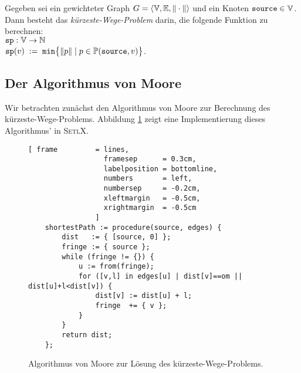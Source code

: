 \begin{Definition} \lb
  Gegeben sei ein gewichteter Graph 
  $G = \langle {\mathbb V}, {\mathbb E}, \|\cdot\| \rangle$ 
  und ein  Knoten $\mbox{\tt source} \in {\mathbb V}$.  Dann besteht das 
  {\em k\"urzeste-Wege-Problem}  darin, die folgende Funktion zu berechnen: \\[0.2cm]
  \hspace*{1.3cm} $\mbox{\tt sp}: {\mathbb V} \rightarrow {\mathbb N}$ \\[0.1cm]
  \hspace*{1.3cm} $\mbox{\tt sp}(v) \;:=\; \mathtt{min}\bigl\{ \|p\| \mid p \in {\mathbb P}(\mbox{\tt source},v) \bigr\}$.
  \conclude  
\end{Definition}

\subsection[Moore's Algorithm]{Der Algorithmus von Moore}
Wir betrachten zun\"achst den Algorithmus von Moore \cite{moore:59} zur Berechnung des k\"urzeste-Wege-Problems.
Abbildung \ref{fig:moore.stlx} zeigt eine Implementierung dieses Algorithmus' in \textsc{SetlX}.

\begin{figure}[!ht]
  \centering
\begin{Verbatim}[ frame         = lines, 
                  framesep      = 0.3cm, 
                  labelposition = bottomline,
                  numbers       = left,
                  numbersep     = -0.2cm,
                  xleftmargin   = -0.5cm,
                  xrightmargin  = -0.5cm
                ]
    shortestPath := procedure(source, edges) {
        dist   := { [source, 0] };
        fringe := { source };
        while (fringe != {}) {
            u := from(fringe);
            for ([v,l] in edges[u] | dist[v]==om || dist[u]+l<dist[v]) {
                dist[v] := dist[u] + l;
                fringe  += { v };
            }
        }
        return dist;
    };
\end{Verbatim}
\vspace*{-0.3cm}
  \caption{Algorithmus von Moore zur L\"osung des k\"urzeste-Wege-Problems.}
  \label{fig:moore.stlx}
\end{figure} 

